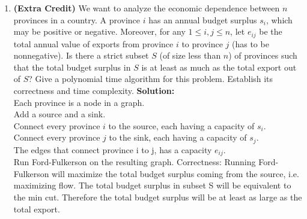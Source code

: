 \documentclass[11pt]{article}
\begin{document}
\begin{enumerate}
\item {\bf (Extra Credit)}
We want to analyze the economic dependence between $n$ provinces in a
country. A province $i$ has an annual budget surplus $s_i$, which may be
positive or negative. Moreover, for any $1\leq i,j\leq n$, let
$e_{ij}$ be the total annual value of exports from province $i$ to
province $j$ (has to be nonnegative). Is there a strict subset $S$ (of
size less than $n$)  of provinces such that the total budget surplus
in $S$ is at least as much as the total export out of $S$? Give a
polynomial time algorithm for this problem. Establish its correctness and
time complexity.
\textbf{Solution:}\\
Each province is a node in a graph.\\
Add a source and a sink.\\
Connect every province $i$ to the source, each having a capacity of $s_i$.\\
Connect every province $j$ to the sink, each having a capacity of $s_j$.\\
The edges that connect province i to j, has a capacity $e_{ij}$.\\
Run Ford-Fulkerson on the resulting graph.
Correctness: Running Ford-Fulkerson will maximize the total budget surplus coming from the source, i.e. maximizing flow. The total budget surplus in subset S will be  equivalent to the min cut. Therefore the total budget surplus will be at least as large as the total export. 
\end{enumerate}
\end{document}
